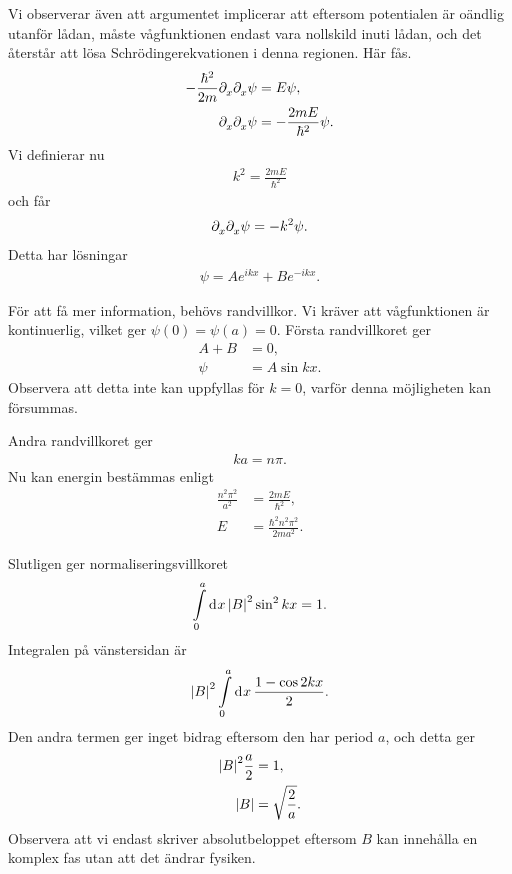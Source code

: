 Vi observerar även att argumentet implicerar att eftersom potentialen är oändlig utanför lådan, måste vågfunktionen endast vara nollskild inuti lådan, och det återstår att lösa Schrödingerekvationen i denna regionen. Här fås.
\begin{align*}
	-\frac{\hbar^{2}}{2m}\partial_{x}^{}\partial_{x}^{}\psi &= E\psi, \\
	\partial_{x}^{}\partial_{x}^{}\psi                      &= -\frac{2mE}{\hbar^{2}}\psi.
\end{align*}
Vi definierar nu
\begin{align*}
	k^{2} = \frac{2mE}{\hbar^{2}}
\end{align*}
och får
\begin{align*}
	\partial_{x}^{}\partial_{x}^{}\psi = -k^{2}\psi.
\end{align*}
Detta har lösningar
\begin{align*}
	\psi = Ae^{ikx} + Be^{-ikx}.
\end{align*}

För att få mer information, behövs randvillkor. Vi kräver att vågfunktionen är kontinuerlig, vilket ger $\psi(0) = \psi(a) = 0$. Första randvillkoret ger
\begin{align*}
	A + B &= 0, \\
	\psi  &= A\sin{kx}.
\end{align*}
Observera att detta inte kan uppfyllas för $k = 0$, varför denna möjligheten kan försummas.

Andra randvillkoret ger
\begin{align*}
	ka = n\pi.
\end{align*}
Nu kan energin bestämmas enligt
\begin{align*}
	\frac{n^{2}\pi^{2}}{a^{2}} &= \frac{2mE}{\hbar^{2}}, \\
	E                          &= \frac{\hbar^{2}n^{2}\pi^{2}}{2ma^{2}}.
\end{align*}

Slutligen ger normaliseringsvillkoret
\begin{align*}
	\int\limits_{0}^{a}\dd[]{x}\abs{B}^{2}\sin^{2}{kx} = 1.
\end{align*}
Integralen på vänstersidan är
\begin{align*}
	\abs{B}^{2}\int\limits_{0}^{a}\dd[]{x}\frac{1 - \cos{2kx}}{2}.
\end{align*}
Den andra termen ger inget bidrag eftersom den har period $a$, och detta ger
\begin{align*}
	\abs{B}^{2}\frac{a}{2} &= 1, \\
	\abs{B}                &= \sqrt{\frac{2}{a}}.
\end{align*}
Observera att vi endast skriver absolutbeloppet eftersom $B$ kan innehålla en komplex fas utan att det ändrar fysiken.

